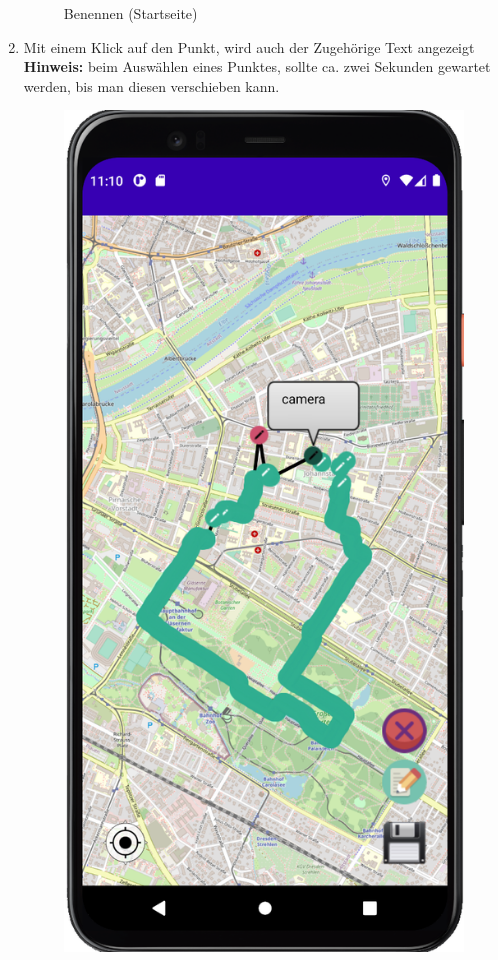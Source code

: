 \documentclass{article}
\begin{document}
\begin{enumerate}
\begin{figure}[H]
		 		\centering
		 		\caption{Benennen (Startseite)}
			\endminipage
		\end{figure}
		\item Mit einem Klick auf den Punkt, wird auch der Zugehörige Text angezeigt \\
		\textbf{Hinweis:} beim Auswählen eines Punktes, sollte ca. zwei Sekunden gewartet werden, bis man diesen verschieben kann.
		\begin{figure}[H]
			\includegraphics[scale=0.9]{spoi_pic4.png}

\end{figure}
\end{enumerate}
\end{document}
